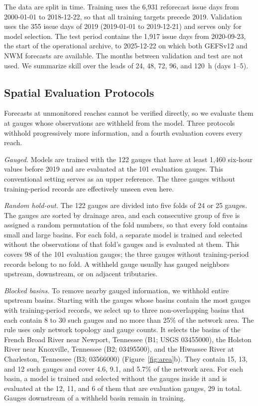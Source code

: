 \documentclass[draft]{agujournal2019}
\begin{document}
The data are split in time. Training uses the 6,931 reforecast issue days from 2000-01-01 to 2018-12-22, so that all training targets precede 2019. Validation uses the 355 issue days of 2019 (2019-01-01 to 2019-12-21) and serves only for model selection. The test period contains the 1,917 issue days from 2020-09-23, the start of the operational archive, to 2025-12-22 on which both GEFSv12 and NWM forecasts are available. The months between validation and test are not used. We summarize skill over the leads of 24, 48, 72, 96, and 120~h (days 1--5).

\subsection{Spatial Evaluation Protocols}
\label{sec:holdout}
Forecasts at unmonitored reaches cannot be verified directly, so we evaluate them at gauges whose observations are withheld from the model. Three protocols withhold progressively more information, and a fourth evaluation covers every reach.

\textit{Gauged.} Models are trained with the 122 gauges that have at least 1,460 six-hour values before 2019 and are evaluated at the 101 evaluation gauges. This conventional setting serves as an upper reference. The three gauges without training-period records are effectively unseen even here.

\textit{Random hold-out.} The 122 gauges are divided into five folds of 24 or 25 gauges. The gauges are sorted by drainage area, and each consecutive group of five is assigned a random permutation of the fold numbers, so that every fold contains small and large basins. For each fold, a separate model is trained and selected without the observations of that fold's gauges and is evaluated at them. This covers 98 of the 101 evaluation gauges; the three gauges without training-period records belong to no fold. A withheld gauge usually has gauged neighbors upstream, downstream, or on adjacent tributaries.

\textit{Blocked basins.} To remove nearby gauged information, we withhold entire upstream basins. Starting with the gauges whose basins contain the most gauges with training-period records, we select up to three non-overlapping basins that each contain 8 to 30 such gauges and no more than 25\% of the network area. The rule uses only network topology and gauge counts. It selects the basins of the French Broad River near Newport, Tennessee (B1; USGS 03455000), the Holston River near Knoxville, Tennessee (B2; 03495500), and the Hiwassee River at Charleston, Tennessee (B3; 03566000) (Figure~\ref{fig:area}b). They contain 15, 13, and 12 such gauges and cover 4.6, 9.1, and 5.7\% of the network area. For each basin, a model is trained and selected without the gauges inside it and is evaluated at the 12, 11, and 6 of them that are evaluation gauges, 29 in total. Gauges downstream of a withheld basin remain in training.
\end{document}
